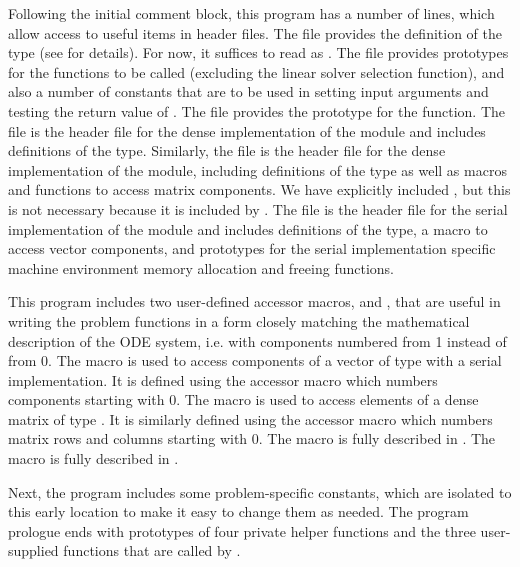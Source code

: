 Following the initial comment block, this program has a number
of  lines, which allow access to useful items in {\cvode}
header files.  The  file provides the definition of the
type  (see  for details).  
For now, it suffices to read  as .
The  file provides prototypes for the {\cvode}
functions to be called (excluding the linear solver selection
function), and also a number of constants that are to be used in
setting input arguments and testing the return value of .
The  file provides the prototype for the
 function.  The 
file is the header file for the dense implementation of the
{\sunlinsol} module and includes definitions of the
 type.  Similarly, the 
file is the header file for the dense implementation of the
{\sunmatrix} module, including definitions of the  type
as well as macros and functions to access matrix components.  
We have explicitly included , but this is not
necessary because it is included by .
The  file is the header file for the serial
implementation of the {\nvector} module and includes definitions of the 
 type, a macro to access vector components, and prototypes 
for the serial implementation specific machine environment memory allocation
and freeing functions.

This program includes two user-defined accessor macros,  and
, that are useful in writing the problem functions in a form
closely matching the mathematical description of the ODE system,
i.e. with components numbered from 1 instead of from 0.  The 
macro is used to access components of a vector of type 
with a serial implementation.  It is defined using the {\nvecs}
accessor macro  which numbers components starting with
0. The  macro is used to access elements of a dense matrix of
type .  It is similarly defined using the {\sunmatdense}
accessor macro  which numbers matrix rows and
columns starting with 
0. 
The macro  is fully described in .
The macro  is fully described in .

Next, the program includes some problem-specific constants, which are
isolated to this early location to make it easy to change them as needed.  
The program prologue ends with prototypes of four private helper
functions and the three user-supplied functions that are called by {\cvode}.

